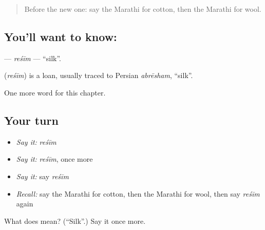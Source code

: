 \label{lesson:MR-C214-resim}



\begin{quote}
Before the new one: say the Marathi for cotton, then the Marathi for wool.
\end{quote}

\subsection*{You'll want to know: }
\textbf{} — \emph{reśīm} — \textquotedblleft{}silk\textquotedblright{}.

\begin{cousinweb}
\textbf{} (\emph{reśīm}) is a loan, usually traced to Persian \emph{abrēsham}, \textquotedblleft{}silk\textquotedblright{}.
\end{cousinweb}

\begin{grammarlens}[title={What you've built}]
One more word for this chapter.
\end{grammarlens}

\subsection*{Your turn}
\begin{itemize}
\raggedright
  \item \emph{Say it:} \emph{reśīm}
  \item \emph{Say it:} \emph{reśīm}, once more
  \item \emph{Say it:} say \emph{reśīm}
  \item \emph{Recall:} say the Marathi for cotton, then the Marathi for wool, then say \emph{reśīm} again
\end{itemize}

\begin{tcolorbox}[breakable,colback=teal!4,colframe=teal!35!black,title={Before you move on}]
What does  mean? (\textquotedblleft{}Silk\textquotedblright{}.) Say it once more.
\end{tcolorbox}
